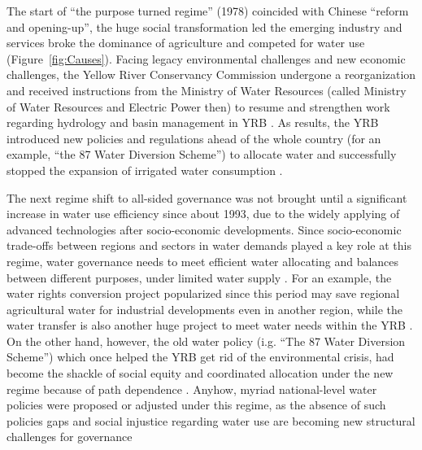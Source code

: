 \documentclass[9pt, twocolumn, twoside, lineno]{pnas-new}
\begin{document}
The start of ``the purpose turned regime'' (1978) coincided with Chinese ``reform and opening-up'', the huge social transformation led the emerging industry and services broke the dominance of agriculture and competed for water use (Figure~\ref{fig:Causes}). 
Facing legacy environmental challenges and new economic challenges, the Yellow River Conservancy Commission undergone a reorganization and received instructions from the Ministry of Water Resources (called Ministry of Water Resources and Electric Power then) to resume and strengthen work regarding hydrology and basin management in YRB 
\cite{yellowriverarchivesOrganizationalHistoryYellow2004}.
As results, the YRB introduced new policies and regulations ahead of the whole country (for an example, ``the 87 Water Diversion Scheme'') to allocate water and successfully stopped the expansion of irrigated water consumption 
\cite{wang2018}.

The next regime shift to all-sided governance was not brought until a significant increase in water use efficiency since about 1993, due to the widely applying of advanced technologies after socio-economic developments. 
Since socio-economic trade-offs between regions and sectors in water demands played a key role at this regime, water governance needs to meet efficient water allocating and balances between different purposes, under limited water supply 
\cite{dalin2015a}.
For an example, the water rights conversion project popularized since this period may save regional agricultural water for industrial developments even in another region, while the water transfer is also another huge project to meet water needs within the YRB
\cite{barnett2015,yunpeng2010}.
On the other hand, however, the old water policy (i.g. ``The 87 Water Diversion Scheme'') which once helped the YRB get rid of the environmental crisis, had become the shackle of social equity and coordinated allocation under the new regime because of path dependence 
\cite{wang2018}.
Anyhow, myriad national-level water policies were proposed or adjusted under this regime, as the absence of such policies gaps and social injustice regarding water use are becoming new structural challenges for governance
\cite{konar2019}
\end{document}

